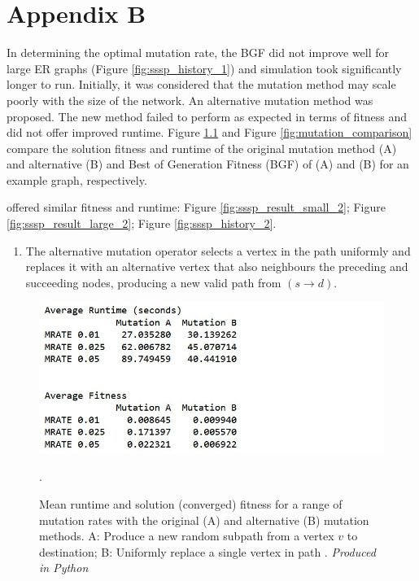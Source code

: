 \documentclass[
	a4paper, %
	10pt, %
	unnumberedsections, %
	twoside, %
]{LTJournalArticle}
\begin{document}
\lstset{
breaklines  = true,
breakatwhitespace   = false,
prebreak= \space,
postbreak   = \space,
language = Python
}



\chapter{Appendix B}

In determining the optimal mutation rate, the BGF did not improve well for large ER graphs (Figure \ref{fig:sssp_history_1}) and simulation took significantly longer to run. 
Initially, it was considered that the mutation method may scale poorly with the size of the network. An alternative mutation method was proposed. The new method failed to perform as expected in terms of fitness and did not offer improved runtime. Figure \ref{fig:mutation_table} and Figure \ref{fig:mutation_comparison} compare the solution fitness and runtime of the original mutation method (A) and alternative (B) and Best of Generation Fitness (BGF) of (A) and (B) for an example graph, respectively. 

offered similar fitness and runtime: Figure \ref{fig:sssp_result_small_2}; Figure \ref{fig:sssp_result_large_2}; Figure \ref{fig:sssp_history_2}. \\

\begin{enumerate}
	\item The alternative mutation operator selects a vertex in the path uniformly and replaces it with an alternative vertex that also neighbours the preceding and succeeding nodes, producing a new valid path from \((s \rightarrow d)\). 
\end{enumerate}



\begin{figure}
	\includegraphics[width=\linewidth]{Figures/sims/mutation/mutation_table.jpg}
	\caption{Mean runtime and solution (converged) fitness for a range of mutation rates with the original (A) and alternative (B) mutation methods. A: Produce a new random subpath from a vertex \(v\) to destination; B: Uniformly replace a single vertex in path .  \emph{Produced in Python}}. 
	\label{fig:mutation_table}
\end{figure}
\end{document}
